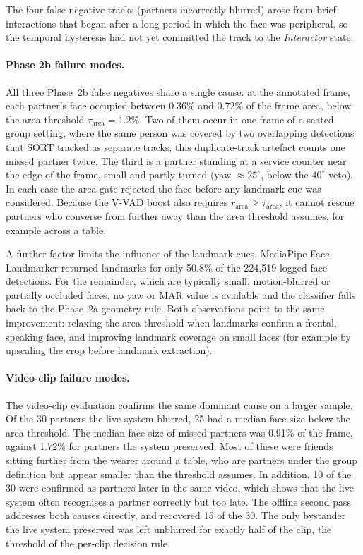 The four false-negative tracks (partners incorrectly blurred) arose from brief
interactions that began after a long period in which the face was peripheral, so
the temporal hysteresis had not yet committed the track to the \emph{Interactor}
state.

\paragraph{Phase 2b failure modes.}
All three Phase~2b false negatives share a single cause: at the annotated frame,
each partner's face occupied between 0.36\% and 0.72\% of the frame area, below the
area threshold $\tau_{\mathrm{area}} = 1.2\%$. Two of them occur in one frame of a
seated group setting, where the same person was covered by two overlapping
detections that SORT tracked as separate tracks; this duplicate-track artefact
counts one missed partner twice. The third is a partner standing at a service
counter near the edge of the frame, small and partly turned (yaw $\approx 25^\circ$,
below the $40^\circ$ veto). In each case the area gate rejected the face before any
landmark cue was considered. Because the V-VAD boost also requires
$r_{\mathrm{area}} \geq \tau_{\mathrm{area}}$, it cannot rescue partners who converse
from further away than the area threshold assumes, for example across a table.

A further factor limits the influence of the landmark cues. MediaPipe Face
Landmarker returned landmarks for only 50.8\% of the 224{,}519 logged face
detections. For the remainder, which are typically small, motion-blurred or partially
occluded faces, no yaw or MAR value is available and the classifier falls back to the
Phase~2a geometry rule. Both observations point to the same improvement: relaxing
the area threshold when landmarks confirm a frontal, speaking face, and improving
landmark coverage on small faces (for example by upscaling the crop before landmark
extraction).

\paragraph{Video-clip failure modes.}
The video-clip evaluation confirms the same dominant cause on a larger sample. Of
the 30 partners the live system blurred, 25 had a median face size below the area
threshold. The median face size of missed partners was 0.91\% of the frame, against
1.72\% for partners the system preserved. Most of these were friends sitting further
from the wearer around a table, who are partners under the group definition but
appear smaller than the threshold assumes. In addition, 10 of the 30 were confirmed
as partners later in the same video, which shows that the live system often
recognises a partner correctly but too late. The offline second pass addresses both
causes directly, and recovered 15 of the 30. The only bystander the live system
preserved was left unblurred for exactly half of the clip, the threshold of the
per-clip decision rule.

